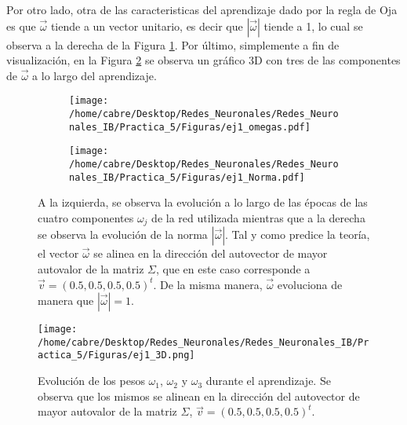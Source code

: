Por otro lado, otra de las caracteristicas del aprendizaje dado por la regla de Oja es que $\vec{\omega}$ tiende a un vector unitario, es decir que $|\vec{\omega}|$ tiende a 1, lo cual se observa a la derecha de la Figura \ref{fig:1_Omegas}. Por último, simplemente a fin de visualización, en la Figura \ref{fig:1_3D} se observa un gráfico 3D con tres de las componentes de $\vec{\omega}$ a lo largo del aprendizaje.



\begin{figure}[htb!]
    \centering
    \begin{subfigure}[h]{0.49\textwidth} 
        \texttt{[image: /home/cabre/Desktop/Redes\_Neuronales/Redes\_Neuronales\_IB/Practica\_5/Figuras/ej1\_omegas.pdf]}
    \end{subfigure}       
    \begin{subfigure}[h]{0.49\textwidth} 
        \texttt{[image: /home/cabre/Desktop/Redes\_Neuronales/Redes\_Neuronales\_IB/Practica\_5/Figuras/ej1\_Norma.pdf]}
    \end{subfigure}
    \caption{A la izquierda, se observa la evolución a lo largo de las épocas de las cuatro componentes $\omega_{j}$ de la red utilizada mientras que a la derecha se observa la evolución de la norma $|\vec{\omega}|$. Tal y como predice la teoría, el vector $\vec{\omega}$ se alinea en la dirección del autovector de mayor autovalor de la matriz $\Sigma$, que en este caso corresponde a $\vec{v} = \left(0.5, 0.5, 0.5, 0.5\right)^{t}$. De la misma manera, $\vec{\omega}$ evoluciona de manera que $|\vec{\omega}| = 1$.}
    \label{fig:1_Omegas}
\end{figure}



\begin{figure}[htb!]
    \centering
    \texttt{[image: /home/cabre/Desktop/Redes\_Neuronales/Redes\_Neuronales\_IB/Practica\_5/Figuras/ej1\_3D.png]}
    \caption{Evolución de los pesos $\omega_{1}$, $\omega_{2}$ y $\omega_{3}$ durante el aprendizaje. Se observa que los mismos se alinean en la dirección del autovector de mayor autovalor de la matriz $\Sigma$, $\vec{v} = \left(0.5, 0.5, 0.5, 0.5\right)^{t}$.}
    \label{fig:1_3D}
\end{figure}

